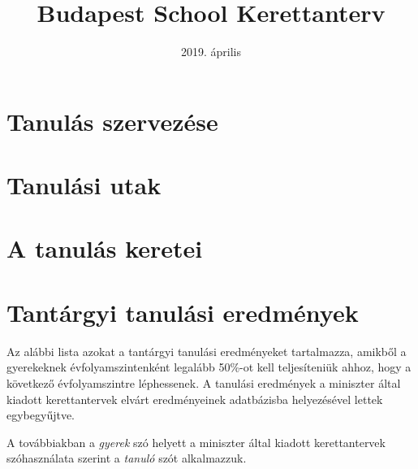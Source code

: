 \documentclass[magyar,12pt,a4paper,oneside]{report}
\begin{document}
\newif\ifkerettanterv
\kerettantervtrue

\title{Budapest School Kerettanterv}
\author{}
\date{2019. \'aprilis}
\maketitle
%

\pagestyle{headings}
\setcounter{page}{1}

\tableofcontents
\newpage
\setcounter{page}{1}



\chapter{Tanulás szervezése}


\chapter{Tanulási utak}


\chapter{A tanulás keretei}


\chapter{Tantárgyi tanulási eredmények}
\label{sec:tantargyi_tanulasi_eredmenyek}
Az alábbi lista azokat a tantárgyi tanulási eredményeket tartalmazza, amikből a
gyerekeknek évfolyamszintenként legalább 50\%-ot kell teljesíteniük ahhoz, hogy
a következő évfolyamszintre léphessenek.
A tanulási eredmények a miniszter
által kiadott kerettantervek\cite{ofi:kerettanterv}  elvárt eredményeinek
adatbázisba
helyezésével lettek egybegyűjtve.

A továbbiakban a \emph{gyerek} szó helyett a miniszter által kiadott
kerettantervek szóhasználata szerint a \emph{tanuló} szót alkalmazzuk.


{}
\label{sec:bibliographyk}

\end{document}
